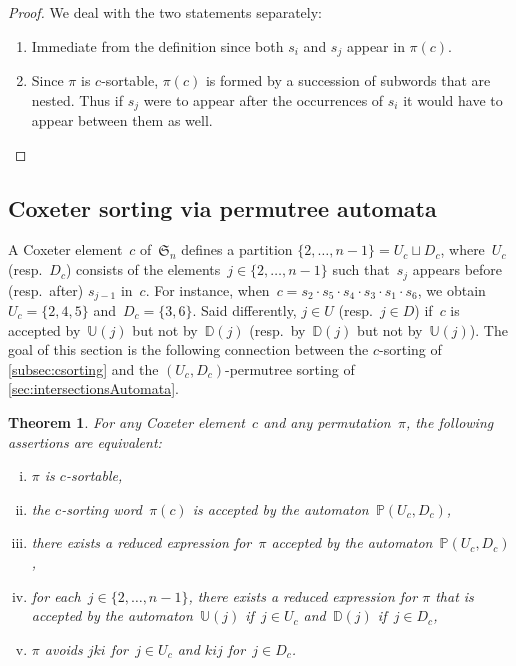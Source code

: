 \documentclass{amsart}
\newtheorem{theorem}{Theorem}%
\newcommand{\fS}{\mathfrak{S}} %
\newcommand{\automatonP}{\mathbb{P}} %
\newcommand{\automatonU}{\mathbb{U}} %
\newcommand{\automatonD}{\mathbb{D}} %
\begin{document}
\begin{proof}
We deal with the two statements separately:
	\begin{enumerate} 
		\item Immediate from the definition since both $s_i$ and $s_j$ appear in $\pi(c)$.
		\item Since $\pi$ is $c$-sortable, $\pi(c)$ is formed by a succession of subwords that are nested. Thus if $s_j$ were to appear after the occurrences of $s_i$ it would have to appear between them as well.
		\qedhere
	\end{enumerate}
\end{proof}

\subsection{Coxeter sorting via permutree automata}

A Coxeter element~$c$ of~$\fS_n$ defines a partition ${\{2, \dots, n-1\} = U_c \sqcup D_c}$, where~$U_c$ (resp.~$D_c$) consists of the elements~$j \in \{2, \dots, n-1\}$ such that~$s_j$ appears before (resp.~after) $s_{j-1}$ in~$c$.
For instance, when~$c = s_2 \cdot s_5 \cdot s_4 \cdot s_3 \cdot s_1 \cdot s_6$, we obtain~$U_c = \{2,4,5\}$ and~$D_c = \{3,6\}$.
Said differently, $j \in U$ (resp.~$j \in D$) if~$c$ is accepted by~$\automatonU(j)$ but not by~$\automatonD(j)$ (resp.~by~$\automatonD(j)$ but not by~$\automatonU(j)$).
The goal of this section is the following connection between the $c$-sorting of \cref{subsec:csorting} and the $(U_c, D_c)$-permutree sorting of \cref{sec:intersectionsAutomata}.

\pagebreak
\begin{theorem}
\label{thm:csorting}
For any Coxeter element~$c$ and any permutation~$\pi$, the following assertions are equivalent:
\begin{enumerate}[(i)]
	\item $\pi$ is $c$-sortable,
	\item the $c$-sorting word~$\pi(c)$ is accepted by the automaton~$\automatonP(U_c, D_c)$,
	\item there exists a reduced expression for~$\pi$ accepted by the automaton~$\automatonP(U_c, D_c)$,
	\item for each~$j \in \{2, \dots, n-1\}$, there exists a reduced expression for $\pi$ that is accepted by the automaton~$\automatonU(j)$ if~$j \in U_c$ and~$\automatonD(j)$ if~$j \in D_c$,
	\item $\pi$ avoids $jki$ for~$j \in U_c$ and $kij$ for~$j \in D_c$.
\end{enumerate}
\end{theorem}
\end{document}
